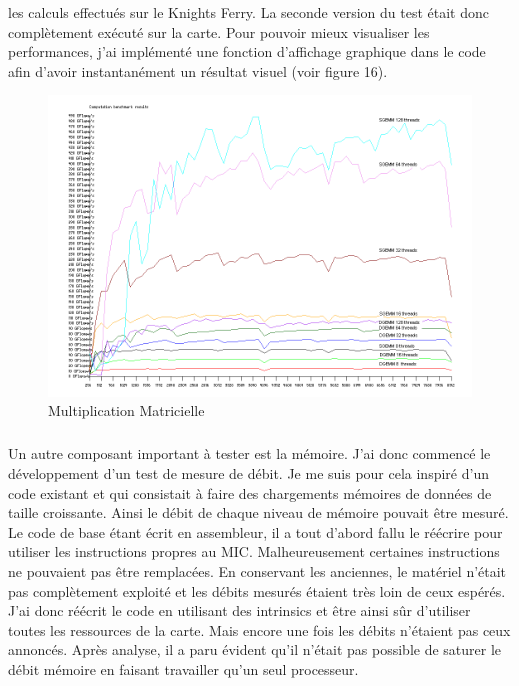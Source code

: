 \documentclass{article}
\begin{document}
					les calculs effectués sur le Knights Ferry. \newline
					La seconde version du test était donc complètement exécuté sur la carte. Pour pouvoir mieux visualiser
					les performances, j'ai implémenté une fonction d'affichage graphique dans le code afin d'avoir instantanément
					un résultat visuel (voir figure 16).
					\begin{figure}
					\begin{center}
					\includegraphics[scale=0.4]{gflops_SGEMM.png}
					\caption{Multiplication Matricielle}
					\end{center}
					\end{figure}
					\subparagraph{}
					Un autre composant important à tester est la mémoire. J'ai donc commencé le développement d'un test de mesure
					de débit. Je me suis pour cela inspiré d'un code existant et qui consistait à faire des chargements mémoires
					de données de taille croissante. Ainsi le débit de chaque niveau de mémoire pouvait être mesuré. Le code de base étant 
					écrit en assembleur, il a tout d'abord fallu le réécrire pour utiliser les instructions propres au MIC. 
					Malheureusement certaines instructions ne pouvaient pas être remplacées. En conservant les anciennes, le 
					matériel n'était pas complètement exploité et les débits mesurés étaient très loin de ceux espérés.
					J'ai donc réécrit le code en utilisant des intrinsics et être ainsi sûr d'utiliser toutes les ressources
					de la carte. Mais encore une fois les débits n'étaient pas ceux annoncés. Après analyse, il a paru évident
					qu'il n'était pas possible de saturer le débit mémoire en faisant travailler qu'un seul processeur.
\end{document}
